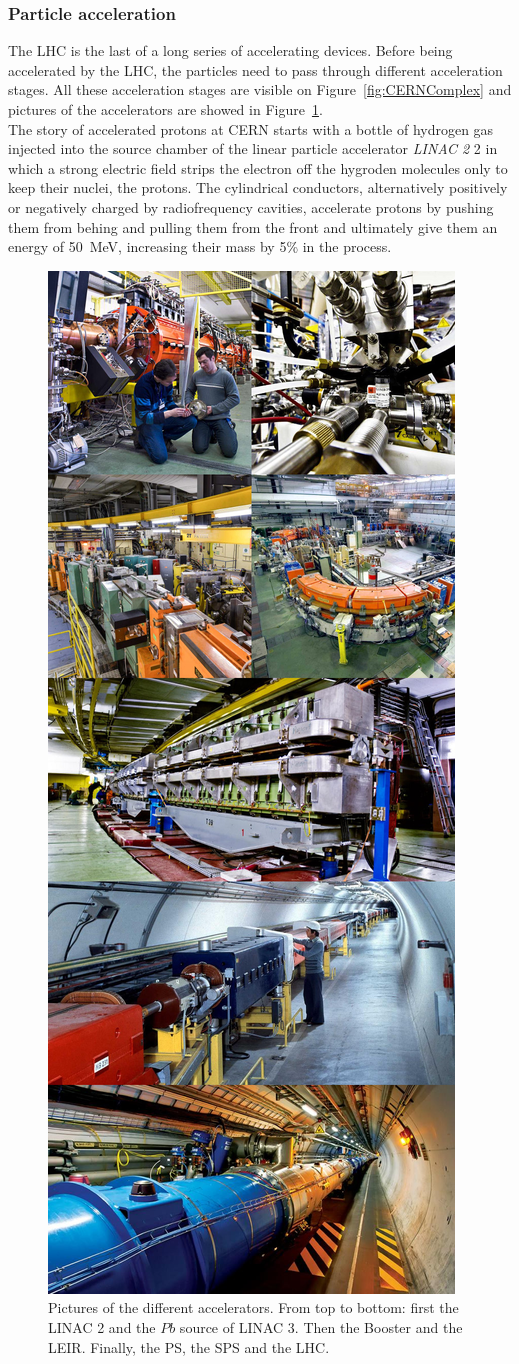 		\subsubsection{Particle acceleration}
		\label{chapt2:sssec:acceleration}
	
	The LHC is the last of a long series of accelerating devices. Before being accelerated by the LHC, the particles need to pass through different acceleration stages. All these acceleration stages are visible on Figure~\ref{fig:CERNComplex} and pictures of the accelerators are showed in Figure~\ref{fig:CERNAccelerators}.\\
	
	The story of accelerated protons at CERN starts with a bottle of hydrogen gas injected into the source chamber of the linear particle accelerator \textit{LINAC 2} 2 in which a strong electric field strips the electron off the hygroden molecules only to keep their nuclei, the protons. The cylindrical conductors, alternatively positively or negatively charged by radiofrequency cavities, accelerate protons by pushing them from behing and pulling them from the front and ultimately give them an energy of \SI{50}{MeV}, increasing their mass by 5\% in the process.\\

	\begin{figure}[H]
		\centering
		\includegraphics[width=0.5\linewidth]{fig/chapt2/CERN-accelerators.jpg}
		\caption{\label{fig:CERNAccelerators} Pictures of the different accelerators. From top to bottom: first the LINAC 2 and the $Pb$ source of LINAC 3. Then the Booster and the LEIR. Finally, the PS, the SPS and the LHC.}
	\end{figure}
	
